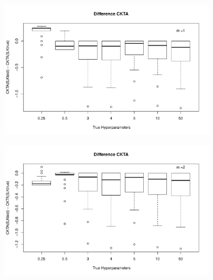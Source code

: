 \documentclass[11pt, a4paper]{article} %
\begin{document}
\restoregeometry



\begin{landscape}
\begin{figure}
\begin{subfigure}{\textwidth}
  \centering
  \includegraphics[width=.8\linewidth]{dif_ckta_m_1.pdf}
  \label{fig:sfig1}
\end{subfigure}%
\begin{subfigure}{\textwidth}
  \centering
  \includegraphics[width=.8\linewidth]{dif_ckta_m_2.pdf}
  \label{fig:sfig2}
\end{subfigure}\\


\end{figure}
\end{landscape}
\end{document}
